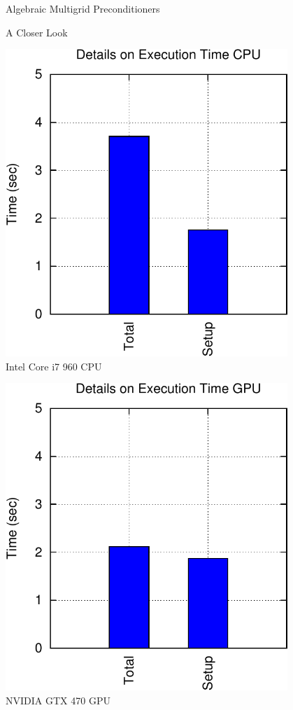 \begin{frame}{Algebraic Multigrid Preconditioners}

 \begin{block}{A Closer Look}
  \vspace*{0.3cm}
  \begin{minipage}{0.48\textwidth}
  \begin{center}
   \includegraphics[width=0.8\textwidth]{figures/bench-details-cpu-2.pdf}\\
   Intel Core i7 960 CPU
  \end{center}
  \end{minipage}
  \begin{minipage}{0.48\textwidth}
  \begin{center}
   \includegraphics[width=0.8\textwidth]{figures/bench-details-gpu-2.pdf}\\
   NVIDIA GTX 470 GPU
  \end{center}
  \end{minipage}
 \end{block}



\end{frame}
